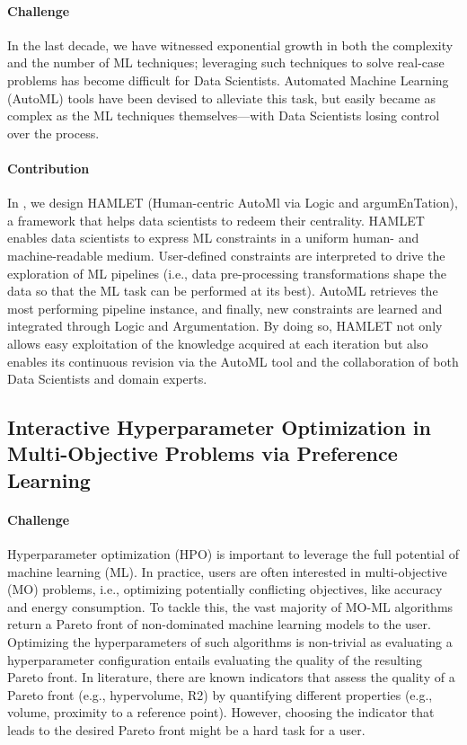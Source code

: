 \paragraph{Challenge} In the last decade, we have witnessed exponential growth in both the complexity and the number of ML techniques; leveraging such techniques to solve real-case problems has become difficult for Data Scientists.
Automated Machine Learning (AutoML) tools have been devised to alleviate this task, but easily became as complex as the ML techniques themselves---with Data Scientists losing control over the process.

\paragraph{Contribution} In , we design HAMLET (Human-centric AutoMl via Logic and argumEnTation), a framework that helps data scientists to redeem their centrality.
HAMLET enables data scientists to express ML constraints in a uniform human- and machine-readable medium.
User-defined constraints are interpreted to drive the exploration of ML pipelines (i.e., data pre-processing transformations shape the data so that the ML task can be performed at its best).
AutoML retrieves the most performing pipeline instance, and finally, new constraints are learned and integrated through Logic and Argumentation.
By doing so, HAMLET not only allows easy exploitation of the knowledge acquired at each iteration but also enables its continuous revision via the AutoML tool and the collaboration of both Data Scientists and domain experts.


\subsection*{Interactive Hyperparameter Optimization in Multi-Objective Problems via Preference Learning}


\paragraph{Challenge} Hyperparameter optimization (HPO) is important to leverage the full potential of machine learning (ML).
In practice, users are often interested in multi-objective (MO) problems, i.e., optimizing potentially conflicting objectives, like accuracy and energy consumption.
To tackle this, the vast majority of MO-ML algorithms return a Pareto front of non-dominated machine learning models to the user.
Optimizing the hyperparameters of such algorithms is non-trivial as evaluating a hyperparameter configuration entails evaluating the quality of the resulting Pareto front.
In literature, there are known indicators that assess the quality of a Pareto front (e.g., hypervolume, R2) by quantifying different properties (e.g., volume, proximity to a reference point).
However, choosing the indicator that leads to the desired Pareto front might be a hard task for a user.

